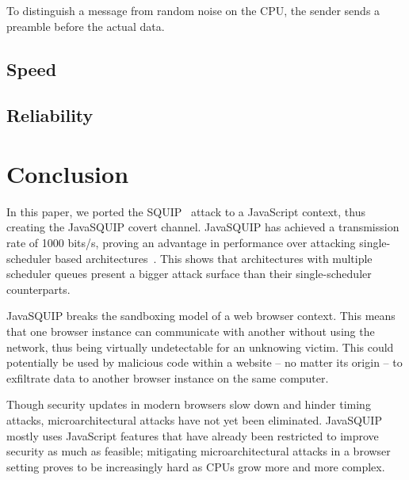 \documentclass[11pt,
  titlepage=false,
]{scrreprt}
\begin{document}
To distinguish a message from random noise on the CPU, the sender sends a preamble before the actual data.


\section{Speed}

\section{Reliability}


\chapter{Conclusion}
\label{ch:conclusion}
In this paper, we ported the SQUIP~\cite{squip} attack to a JavaScript context, thus creating the JavaSQUIP covert channel.
JavaSQUIP has achieved a transmission rate of 1000 bits/s, proving an advantage in performance over attacking single-scheduler based architectures~\cite{Rokicki2022webport}.
This shows that architectures with multiple scheduler queues present a bigger attack surface than their single-scheduler counterparts.

JavaSQUIP breaks the sandboxing model of a web browser context.
This means that one browser instance can communicate with another without using the network, thus being virtually undetectable for an unknowing victim.
This could potentially be used by malicious code within a website -- no matter its origin -- to exfiltrate data to another browser instance on the same computer.

Though security updates in modern browsers slow down and hinder timing attacks, microarchitectural attacks have not yet been eliminated.
JavaSQUIP mostly uses JavaScript features that have already been restricted to improve security as much as feasible;
mitigating microarchitectural attacks in a browser setting proves to be increasingly hard as CPUs grow more and more complex.



\printbibliography
\end{document}

